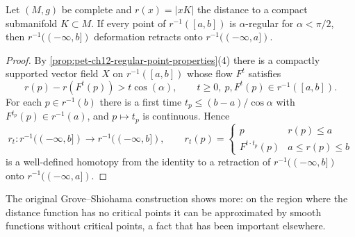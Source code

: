 \begin{lemma}
  \label{lem:pet-ch12-retraction-lemma}
  Let $(M,g)$ be complete and $r(x)=|xK|$ the distance to a compact submanifold
  $K\subset M$. If every point of $r^{-1}([a,b])$ is $\alpha$-regular for
  $\alpha<\pi/2$, then $r^{-1}((-\infty,b])$ deformation retracts onto
  $r^{-1}((-\infty,a])$.
\end{lemma}
\begin{proof}
  By \cref{prop:pet-ch12-regular-point-properties}(4) there is a compactly
  supported vector field $X$ on $r^{-1}([a,b])$ whose flow $F^t$ satisfies
  \[
    r(p)-r(F^t(p))>t\cos(\alpha),\qquad t\ge0,\ p,F^t(p)\in r^{-1}([a,b]).
  \]
  For each $p\in r^{-1}(b)$ there is a first time $t_p\le(b-a)/\cos\alpha$ with
  $F^{t_p}(p)\in r^{-1}(a)$, and $p\mapsto t_p$ is continuous. Hence
  \[
    r_t:r^{-1}((-\infty,b])\to r^{-1}((-\infty,b]),\qquad
    r_t(p)=\begin{cases}p & r(p)\le a\\ F^{t\cdot t_p}(p) & a\le r(p)\le b\end{cases}
  \]
  is a well-defined homotopy from the identity to a retraction of
  $r^{-1}((-\infty,b])$ onto $r^{-1}((-\infty,a])$.
\end{proof}

\begin{remark}
  \label{rem:pet-ch12-retraction-remark}
  The original Grove--Shiohama construction shows more: on the region where the
  distance function has no critical points it can be approximated by smooth
  functions without critical points, a fact that has been important elsewhere.
\end{remark}


